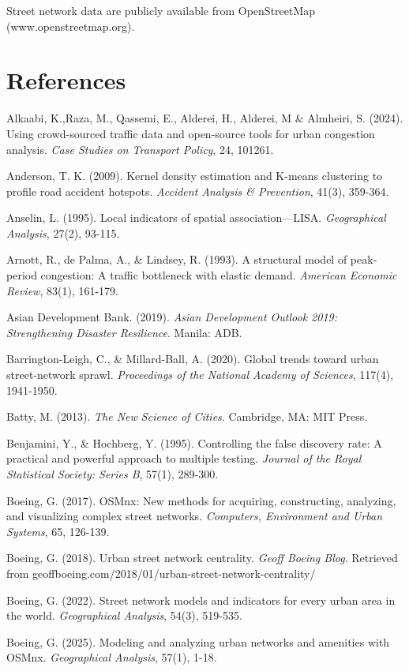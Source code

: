 \documentclass[12pt,a4paper]{article}
\begin{document}
Street network data are publicly available from OpenStreetMap (www.openstreetmap.org).



\section*{References}

Alkaabi, K.,Raza, M., Qassemi, E., Alderei, H., Alderei, M \& Almheiri, S. (2024). Using crowd-sourced traffic data and open-source tools for urban congestion analysis. \emph{Case Studies on Transport Policy}, 24, 101261.

Anderson, T. K. (2009). Kernel density estimation and K-means clustering to profile road accident hotspots. \emph{Accident Analysis \& Prevention}, 41(3), 359-364.

Anselin, L. (1995). Local indicators of spatial association---LISA. \emph{Geographical Analysis}, 27(2), 93-115.

Arnott, R., de Palma, A., \& Lindsey, R. (1993). A structural model of peak-period congestion: A traffic bottleneck with elastic demand. \emph{American Economic Review}, 83(1), 161-179.

Asian Development Bank. (2019). \emph{Asian Development Outlook 2019: Strengthening Disaster Resilience}. Manila: ADB.

Barrington-Leigh, C., \& Millard-Ball, A. (2020). Global trends toward urban street-network sprawl. \emph{Proceedings of the National Academy of Sciences}, 117(4), 1941-1950.

Batty, M. (2013). \emph{The New Science of Cities}. Cambridge, MA: MIT Press.

Benjamini, Y., \& Hochberg, Y. (1995). Controlling the false discovery rate: A practical and powerful approach to multiple testing. \emph{Journal of the Royal Statistical Society: Series B}, 57(1), 289-300.

Boeing, G. (2017). OSMnx: New methods for acquiring, constructing, analyzing, and visualizing complex street networks. \emph{Computers, Environment and Urban Systems}, 65, 126-139.

Boeing, G. (2018). Urban street network centrality. \emph{Geoff Boeing Blog}. Retrieved from geoffboeing.com/2018/01/urban-street-network-centrality/

Boeing, G. (2022). Street network models and indicators for every urban area in the world. \emph{Geographical Analysis}, 54(3), 519-535.

Boeing, G. (2025). Modeling and analyzing urban networks and amenities with OSMnx. \emph{Geographical Analysis}, 57(1), 1-18.
\end{document}
